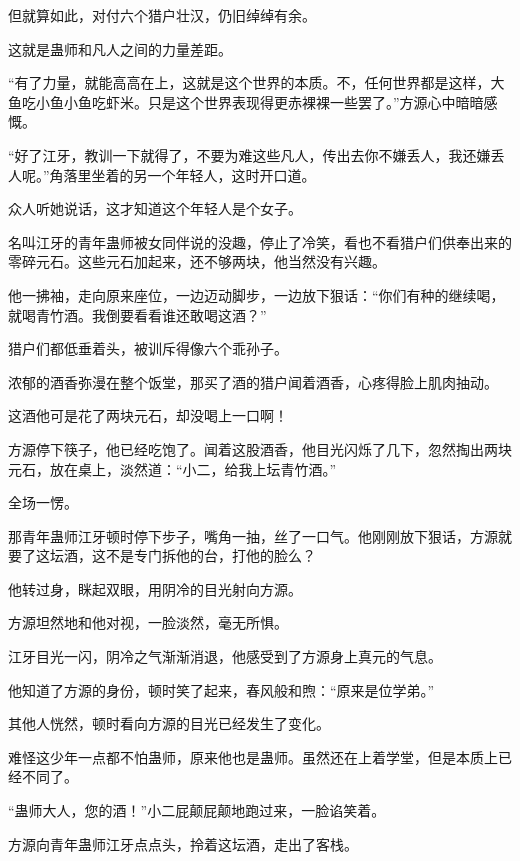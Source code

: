 \begin{this_body}
但就算如此，对付六个猎户壮汉，仍旧绰绰有余。

这就是蛊师和凡人之间的力量差距。

“有了力量，就能高高在上，这就是这个世界的本质。不，任何世界都是这样，大鱼吃小鱼小鱼吃虾米。只是这个世界表现得更赤裸裸一些罢了。”方源心中暗暗感慨。

“好了江牙，教训一下就得了，不要为难这些凡人，传出去你不嫌丢人，我还嫌丢人呢。”角落里坐着的另一个年轻人，这时开口道。

众人听她说话，这才知道这个年轻人是个女子。

名叫江牙的青年蛊师被女同伴说的没趣，停止了冷笑，看也不看猎户们供奉出来的零碎元石。这些元石加起来，还不够两块，他当然没有兴趣。

他一拂袖，走向原来座位，一边迈动脚步，一边放下狠话：“你们有种的继续喝，就喝青竹酒。我倒要看看谁还敢喝这酒？”

猎户们都低垂着头，被训斥得像六个乖孙子。

浓郁的酒香弥漫在整个饭堂，那买了酒的猎户闻着酒香，心疼得脸上肌肉抽动。

这酒他可是花了两块元石，却没喝上一口啊！

方源停下筷子，他已经吃饱了。闻着这股酒香，他目光闪烁了几下，忽然掏出两块元石，放在桌上，淡然道：“小二，给我上坛青竹酒。”

全场一愣。

那青年蛊师江牙顿时停下步子，嘴角一抽，丝了一口气。他刚刚放下狠话，方源就要了这坛酒，这不是专门拆他的台，打他的脸么？

他转过身，眯起双眼，用阴冷的目光射向方源。

方源坦然地和他对视，一脸淡然，毫无所惧。

江牙目光一闪，阴冷之气渐渐消退，他感受到了方源身上真元的气息。

他知道了方源的身份，顿时笑了起来，春风般和煦：“原来是位学弟。”

其他人恍然，顿时看向方源的目光已经发生了变化。

难怪这少年一点都不怕蛊师，原来他也是蛊师。虽然还在上着学堂，但是本质上已经不同了。

“蛊师大人，您的酒！”小二屁颠屁颠地跑过来，一脸谄笑着。

方源向青年蛊师江牙点点头，拎着这坛酒，走出了客栈。

\end{this_body}

